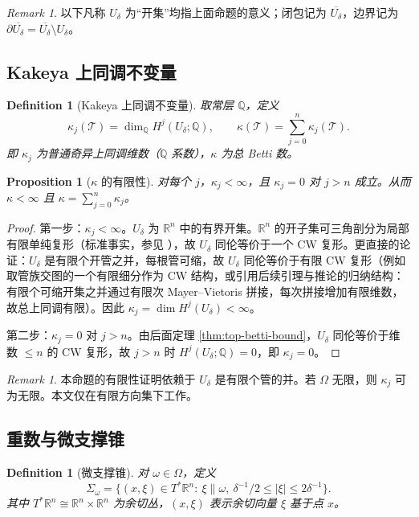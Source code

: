 \documentclass[11pt,a4paper]{article}
\newtheorem{proposition}[theorem]{Proposition}
\newtheorem{definition}[theorem]{Definition}
\theoremstyle{remark}
\newtheorem{remark}[theorem]{Remark}
\begin{document}
	\begin{remark}
		以下凡称 $U_\delta$ 为“开集”均指上面命题的意义；闭包记为 $\overline{U_\delta}$，边界记为 $\partial\overline{U_\delta}=\overline{U_\delta}\setminus U_\delta$。
	\end{remark}
	
	\subsection{Kakeya 上同调不变量}
	\begin{definition}[Kakeya 上同调不变量]
		取常层 $\mathbb Q$，定义
		\[
		\kappa_j(\mathcal T)=\dim_{\mathbb Q}H^j(U_\delta;\mathbb Q),\qquad
		\kappa(\mathcal T)=\sum_{j=0}^n\kappa_j(\mathcal T).
		\]
		即 $\kappa_j$ 为普通奇异上同调维数（$\mathbb Q$ 系数），$\kappa$ 为总 Betti 数。
	\end{definition}
	
	\begin{proposition}[$\kappa$ 的有限性]
		对每个 $j$，$\kappa_j<\infty$，且 $\kappa_j=0$ 对 $j>n$ 成立。从而 $\kappa<\infty$ 且 $\kappa=\sum_{j=0}^n\kappa_j$。
	\end{proposition}
	
	\begin{proof}
		第一步：$\kappa_j<\infty$。$U_\delta$ 为 $\mathbb R^n$ 中的有界开集。$\mathbb R^n$ 的开子集可三角剖分为局部有限单纯复形（标准事实，参见 \cite{HatcherAT, MunkresEAT}），故 $U_\delta$ 同伦等价于一个 CW 复形。更直接的论证：$U_\delta$ 是有限个开管之并，每根管可缩，故 $U_\delta$ 同伦等价于有限 CW 复形（例如取管族交图的一个有限细分作为 CW 结构，或引用后续引理与推论的归纳结构：有限个可缩开集之并通过有限次 Mayer--Vietoris 拼接，每次拼接增加有限维数，故总上同调有限）。因此 $\kappa_j=\dim H^j(U_\delta)<\infty$。
		
		第二步：$\kappa_j=0$ 对 $j>n$。由后面定理 \ref{thm:top-betti-bound}，$U_\delta$ 同伦等价于维数 $\le n$ 的 CW 复形，故 $j>n$ 时 $H^j(U_\delta;\mathbb Q)=0$，即 $\kappa_j=0$。
	\end{proof}
	
	\begin{remark}
		本命题的有限性证明依赖于 $U_\delta$ 是有限个管的并。若 $\Omega$ 无限，则 $\kappa_j$ 可为无限。本文仅在有限方向集下工作。
	\end{remark}
	
	\subsection{重数与微支撑锥}
	\begin{definition}[微支撑锥]
		对 $\omega\in\Omega$，定义
		\[
		\Sigma_\omega=\{(x,\xi)\in T^*\mathbb R^n:\ \xi\parallel\omega,\ \delta^{-1}/2\le|\xi|\le2\delta^{-1}\}.
		\]
		其中 $T^*\mathbb R^n\cong\mathbb R^n\times\mathbb R^n$ 为余切丛，$(x,\xi)$ 表示余切向量 $\xi$ 基于点 $x$。
	\end{definition}
	
\end{document}
